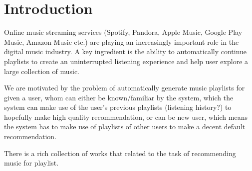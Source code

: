 \section{Introduction}
\label{sec:intro}
Online music streaming services (\eg Spotify, Pandora, Apple Music, Google Play Music, Amazon Music etc.) 
are playing an increasingly important role in the digital music industry.
A key ingredient is the ability to automatically continue playlists 
to create an uninterrupted listening experience and help user explore a large collection of music.



We are motivated by the problem of automatically generate music playlists for given a user,
whom can either be known/familiar by the system, which the system can make use of the user's previous playlists (listening history?)
to hopefully make high quality recommendation, or can be new user, which means the system has to make use of playlists of other users
to make a decent default recommendation.

There is a rich collection of works that related to the task of recommending music for playlist.



